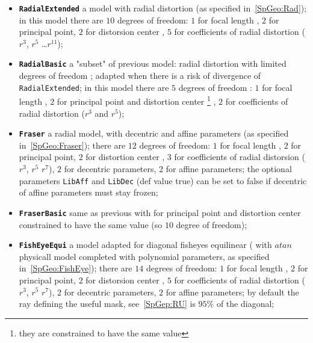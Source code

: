 \begin{itemize}

   \item {\tt \bf RadialExtended} a model with radial distortion
         (as specified in~\ref{SpGeo:Rad});
         in this model there are $10$ degrees of freedom:
         $1$ for focal length  , $2$ for principal point, $2$ for distorsion center ,
         $5$ for coefficients of radial distortion ($r^3$, $r^5$ \dots $r^{11}$);

   \item {\tt \bf RadialBasic}  a "subset" of previous model:
          radial distortion with limited degrees of freedom ;
         adapted when there is a risk of divergence of {\tt RadialExtended};
         in this model there are $5$ degrees of freedom :  $1$ for focal length  ,
         $2$ for principal point and distortion center \footnote{they are constrained to have
         the same value} ,
         $2$ for coefficients of radial distortion ($r^3$ and  $r^5$);



   \item {\tt \bf Fraser}  a radial model, with decentric and affine parameters
          (as specified in~\ref{SpGeo:Fraser}); there are $12$ degrees of freedom:
         $1$ for focal length  , $2$ for principal point, $2$ for distortion center ,
         $3$ for coefficients of radial distorsion ($r^3$, $r^5$  $r^7$),
         $2$ for decentric parameters, $2$ for affine parameters;
         the optional parameters {\tt LibAff} and {\tt LibDec} (def value true) can
         be set to false if decentric of affine parameters must stay frozen;


   \item {\tt \bf FraserBasic}  same as previous with for principal point and distortion center
         constrained to have the same value (so $10$ degree of freedom);

   \item {\tt \bf FishEyeEqui}  a model adapted for diagonal fisheyes equilinear
         ( with $atan$ physicall model completed with polynomial parameters,
          as specified in~\ref{SpGeo:FishEye}); there are $14$ degrees of freedom:
         $1$ for focal length  , $2$ for principal point, $2$ for distorsion center ,
         $5$ for coefficients of radial distortion ($r^3$, $r^5$  $r^7$),
         $2$ for decentric parameters, $2$ for affine parameters;
         by default the ray defining the useful mask, see~\ref{SpGep:RU}
         is $95\%$ of the diagonal;



\end{itemize}
